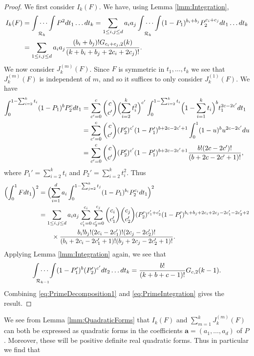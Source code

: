 \documentclass[12pt,a4paper]{amsart}
\theoremstyle{plain}
\numberwithin{sblmm}{thrm}
\numberwithin{equation}{section}
\begin{document}
\begin{proof}
We first consider $I_k(F)$. We have, using Lemma \ref{lmm:Integration},
\begin{align}
I_k(F)&=\idotsint\limits_{\mathcal{R}_k}P^2dt_1\dotsc dt_k=\sum_{1\le i,j\le d}a_ia_j\idotsint\limits_{\mathcal{R}_k}(1-P_1)^{b_i+b_j}P_2^{c_i+c_j}dt_1\dotsc dt_k\nonumber\\
&=\sum_{1\le i,j\le d}a_ia_j\frac{(b_i+b_j)!G_{c_i+c_j,2}(k)}{(k+b_i+b_j+2c_i+2c_j)!}.
\end{align}
We now consider $J^{(m)}_k(F)$. Since $F$ is symmetric in $t_1,\dotsc,t_k$ we see that $J_k^{(m)}(F)$ is independent of $m$, and so it suffices to only consider $J^{(1)}_k(F)$. We have
\begin{align}
\int_0^{1-\sum_{i=2}^kt_i}(1-P_1)^bP_2^c dt_1&=\sum_{c'=0}^c \binom{c}{c'}\Bigl(\sum_{i=2}^kt_i^2\Bigr)^{c'}\int_0^{1-\sum_{i=2}^kt_i}\Bigl(1-\sum_{i=1}^kt_i\Bigr)^bt_1^{2c-2c'}dt_1\nonumber\\
&=\sum_{c'=0}^c \binom{c}{c'}(P'_2)^{c'}(1-P_1')^{b+2c-2c'+1}\int_0^1(1-u)^bu^{2c-2c'}du\nonumber\\
&=\sum_{c'=0}^c \binom{c}{c'}(P'_2)^{c'}(1-P_1')^{b+2c-2c'+1}\frac{b!(2c-2c')!}{(b+2c-2c'+1)!},
\end{align}
where $P_1'=\sum_{i=2}^kt_i$ and $P_2'=\sum_{i=2}^kt_i^2$. Thus
\begin{align}
\Bigl(\int_0^1Fdt_1\Bigr)^2&=\Bigl(\sum_{i=1}^da_i\int_0^{1-\sum_{j=2}^kt_j}(1-P_1)^{b_i}P_2^{c_i}dt_1\Bigr)^2\nonumber\\
&=\sum_{1\le i,j\le d}a_ia_j\sum_{c'_1=0}^{c_i}\sum_{c'_2=0}^{c_j}\binom{c_i}{c_1'}\binom{c_j}{c_2'}(P_2')^{c_1'+c_2'}(1-P_1')^{b_i+b_j+2c_i+2c_j-2c_1'-2c_2'+2}\nonumber\\
&\qquad\times \frac{b_i!b_j!(2c_i-2c'_1)!(2c_j-2c'_2)!}{(b_i+2c_i-2c'_1+1)!(b_j+2c_j-2c'_2+1)!
}.\label{eq:PrimeDecomposition1}
\end{align}
Applying Lemma \ref{lmm:Integration} again, we see that
\begin{equation}
\idotsint\limits_{\mathcal{R}_{k-1}}(1-P_1')^{b}(P_2')^{c'}dt_2\dotsc dt_k=\frac{b!}{(k+b+c-1)!}G_{c,2}(k-1).\label{eq:PrimeIntegration}
\end{equation}
Combining \eqref{eq:PrimeDecomposition1} and \eqref{eq:PrimeIntegration} gives the result.
\end{proof}
We see from Lemma \ref{lmm:QuadraticForms} that $I_k(F)$ and $\sum_{m=1}^kJ_k^{(m)}(F)$ can both be expressed as quadratic forms in the coefficients $\mathbf{a}=(a_1,\dots,a_d)$ of $P$. Moreover, these will be positive definite real quadratic forms. Thus in particular we find that
\end{document}

